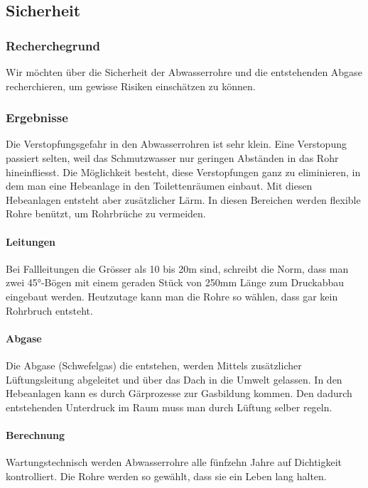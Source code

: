 \subsection{Sicherheit}


\subsubsection{Recherchegrund}
Wir möchten über die Sicherheit der Abwasserrohre und die entstehenden Abgase recherchieren, um gewisse Risiken einschätzen zu können. 
\subsubsection{Ergebnisse}
Die Verstopfungsgefahr in den Abwasserrohren ist sehr klein. %
Eine Verstopung passiert selten, weil das Schmutzwasser nur geringen Abständen in das Rohr hineinfliesst. Die Möglichkeit besteht, diese Verstopfungen ganz zu eliminieren, in dem man eine Hebeanlage in den Toilettenräumen einbaut. Mit diesen Hebeanlagen entsteht aber zusätzlicher Lärm. In diesen Bereichen werden flexible Rohre benützt, um Rohrbrüche zu vermeiden.
\paragraph{Leitungen}
Bei Fallleitungen die Grösser als 10 bis 20\si{m} sind, schreibt die Norm, dass man zwei 45°-Bögen mit einem geraden Stück von 250\si{mm} Länge zum Druckabbau eingebaut werden. Heutzutage kann man die Rohre so wählen, dass gar kein Rohrbruch entsteht.
\paragraph{Abgase}
Die Abgase (Schwefelgas) die entstehen, werden Mittels zusätzlicher Lüftungsleitung abgeleitet und über das Dach in die Umwelt gelassen. In den Hebeanlagen kann es durch Gärprozesse zur Gasbildung kommen. Den dadurch entstehenden Unterdruck im Raum muss man durch Lüftung selber regeln. 
\paragraph{Berechnung}
Wartungstechnisch werden Abwasserrohre alle fünfzehn Jahre auf Dichtigkeit kontrolliert. Die Rohre werden so gewählt, dass sie ein Leben lang halten.

